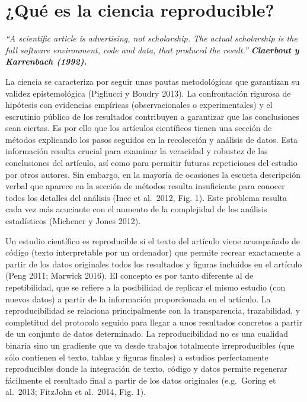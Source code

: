 \documentclass[]{tufte-handout}
\begin{document}
\hypertarget{quuxe9-es-la-ciencia-reproducible}{%
\section{¿Qué es la ciencia
reproducible?}\label{quuxe9-es-la-ciencia-reproducible}}

\emph{``A scientific article is advertising, not scholarship. The actual
scholarship is the full software environment, code and data, that
produced the result.''} \textbf{\emph{Claerbout y Karrenbach (1992).}}

La ciencia se caracteriza por seguir unas pautas metodológicas que
garantizan su validez epistemológica (Pigliucci y Boudry 2013). La
confrontación rigurosa de hipótesis con evidencias empíricas
(observacionales o experimentales) y el escrutinio público de los
resultados contribuyen a garantizar que las conclusiones sean ciertas.
Es por ello que los artículos científicos tienen una sección de métodos
explicando los pasos seguidos en la recolección y análisis de datos.
Esta información resulta crucial para examinar la veracidad y robustez
de las conclusiones del artículo, así como para permitir futuras
repeticiones del estudio por otros autores. Sin embargo, en la mayoría
de ocasiones la escueta descripción verbal que aparece en la sección de
métodos resulta insuficiente para conocer todos los detalles del
análisis (Ince et al.~2012, Fig. 1). Este problema resulta cada vez más
acuciante con el aumento de la complejidad de los análisis estadísticos
(Michener y Jones 2012).

Un estudio científico es reproducible si el texto del artículo viene
acompañado de código (texto interpretable por un ordenador) que permite
recrear exactamente a partir de los datos originales todos los
resultados y figuras incluidos en el artículo (Peng 2011; Marwick 2016).
El concepto es por tanto diferente al de repetibilidad, que se refiere a
la posibilidad de replicar el mismo estudio (con nuevos datos) a partir
de la información proporcionada en el artículo. La reproducibilidad se
relaciona principalmente con la transparencia, trazabilidad, y
completitud del protocolo seguido para llegar a unos resultados
concretos a partir de un conjunto de datos determinado. La
reproducibilidad no es una cualidad binaria sino un gradiente que va
desde trabajos totalmente irreproducibles (que sólo contienen el texto,
tablas y figuras finales) a estudios perfectamente reproducibles donde
la integración de texto, código y datos permite regenerar fácilmente el
resultado final a partir de los datos originales (e.g.~Goring et
al.~2013; FitzJohn et al.~2014, Fig. 1).
\end{document}

